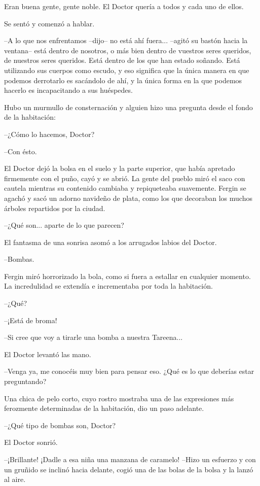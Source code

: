Eran buena gente, gente noble. El Doctor quería a todos y cada uno de ellos.

Se sentó y comenzó a hablar.

--A lo que nos enfrentamos --dijo-- no está ahí fuera... --agitó su bastón hacia la ventana-- está dentro de nosotros, o más bien dentro de vuestros seres queridos, de nuestros seres queridos. Está dentro de los que han estado soñando. Está utilizando sus cuerpos como escudo, y eso significa que la única manera en que podemos derrotarlo es sacándolo de ahí, y la única forma en la que podemos hacerlo es incapacitando a sus huéspedes.

Hubo un murmullo de consternación y alguien hizo una pregunta desde el fondo de la habitación:

--¿Cómo lo hacemos, Doctor?

--Con ésto.

El Doctor dejó la bolsa en el suelo y la parte superior, que había apretado firmemente con el puño, cayó y se abrió. La gente del pueblo miró el saco con cautela mientras su contenido cambiaba y repiqueteaba suavemente. Fergin se agachó y sacó un adorno navideño de plata, como los que decoraban los muchos árboles repartidos por la ciudad.

--¿Qué son... aparte de lo que parecen?

El fantasma de una sonrisa asomó a los arrugados labios del Doctor.

--Bombas.

Fergin miró horrorizado la bola, como si fuera a estallar en cualquier momento. La incredulidad se extendía e incrementaba por toda la habitación.

--¿Qué?

--¡Está de broma!

--Si cree que voy a tirarle una bomba a nuestra Tareena...

El Doctor levantó las mano. 

--Venga ya, me conocéis muy bien para pensar eso. ¿Qué es lo que deberías estar preguntando?

Una chica de pelo corto, cuyo rostro mostraba una de las expresiones más ferozmente determinadas de la habitación, dio un paso adelante. 

--¿Qué tipo de bombas son, Doctor?

El Doctor sonrió. 

--¡Brillante! ¡Dadle a esa niña una manzana de caramelo! --Hizo un esfuerzo y con un gruñido se inclinó hacia delante, cogió una de las bolas de la bolsa y la lanzó al aire.

